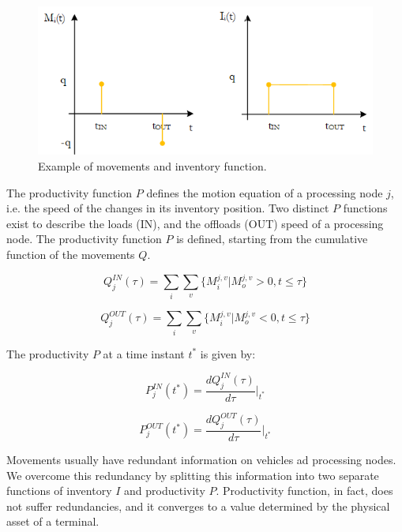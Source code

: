 \begin{figure}[hbt!]
\centering
\includegraphics[width=1\textwidth]{SectionIntroduction/informationFramework_figures/fig_movementsInventory.png}
\captionsetup{type=figure}
\caption{Example of movements and inventory function.}
\label{fig_movementsInventory}
\end{figure}

The productivity function $P$ defines the motion equation of a processing node $j$, i.e. the speed of the changes in its inventory position. Two distinct $P$ functions exist to describe the loads (IN), and the offloads (OUT) speed of a processing node. The productivity function $P$ is defined, starting from the cumulative function of the movements $Q$.

\begin{equation}
Q_j^{IN}(\tau)=\sum_{i}\sum_{v}\{M_i^{j,v}|M_o^{j,v}>0,t\leq \tau \}
\label{eqQIN}
\end{equation}

\begin{equation}
Q_j^{OUT}(\tau)=\sum_{i}\sum_{v}\{M_i^{j,v}|M_o^{j,v}<0,t\leq \tau \}
\label{eqQOUT}
\end{equation}

The productivity $P$ at a time instant $t^\ast$ is given by:

\begin{equation}
P_j^{IN} (t^* )=\frac{dQ_j^{IN} (\tau)}{d\tau}\vert_{t^*}
\label{eqProdIN}
\end{equation}

\begin{equation}
P_j^{OUT} (t^* )=\frac{dQ_j^{OUT} (\tau)}{d\tau}\vert_{t^*}
\label{eqProdOUT}
\end{equation}

Movements usually have redundant information on vehicles ad processing nodes. We overcome this redundancy by splitting this information into two separate functions of inventory $I$ and productivity $P$. Productivity function, in fact, does not suffer redundancies, and it converges to a value determined by the physical asset of a terminal. \par

